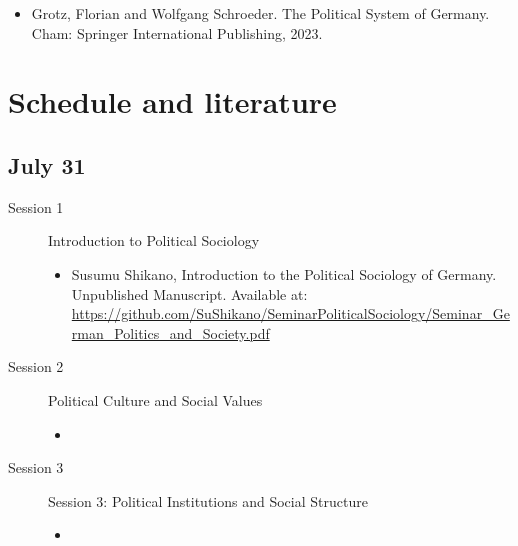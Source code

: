 \documentclass[12p,a4]{article}
\begin{document}
\begin{itemize}
    \item Grotz, Florian and Wolfgang Schroeder. The Political System of Germany. Cham: Springer International Publishing, 2023.
\end{itemize}


\section{Schedule and literature}

\subsection*{July 31}

                \begin{description}
                    \item[Session 1]{Introduction to Political Sociology} 
				\begin{itemize}
				    \item Susumu Shikano, Introduction to the Political Sociology of Germany. Unpublished Manuscript. Available at: \url{https://github.com/SuShikano/SeminarPoliticalSociology/Seminar_German_Politics_and_Society.pdf}
				\end{itemize}
				
\item[Session 2] {Political Culture and Social Values}				

                \begin{itemize}
                    \item \citet{Pickel02012023}
                \end{itemize}
				
				
\item[Session 3] {Session 3: Political Institutions and Social Structure}				
				\begin{itemize}
                    \item \cite{Schmidt02042016}
				\end{itemize}
				

\end{description}
\end{document}
